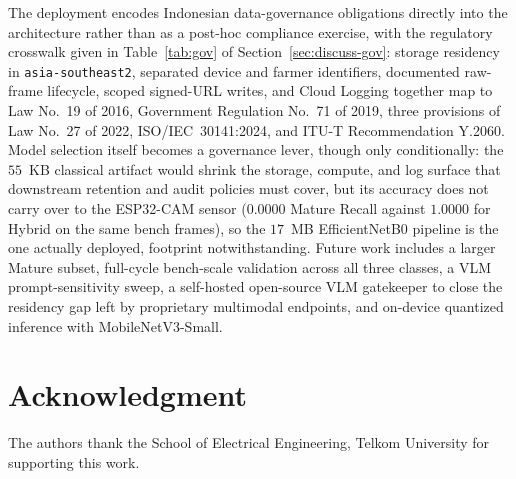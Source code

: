 \documentclass[conference]{IEEEtran}
\begin{document}
The deployment encodes Indonesian data-governance obligations directly into the architecture rather than as a post-hoc compliance exercise, with the regulatory crosswalk given in Table~\ref{tab:gov} of Section~\ref{sec:discuss-gov}: storage residency in \texttt{asia-southeast2}, separated device and farmer identifiers, documented raw-frame lifecycle, scoped signed-URL writes, and Cloud Logging together map to Law No.~19 of 2016, Government Regulation No.~71 of 2019, three provisions of Law No.~27 of 2022, ISO/IEC~30141:2024, and ITU-T Recommendation Y.2060. Model selection itself becomes a governance lever, though only conditionally: the $55$~KB classical artifact would shrink the storage, compute, and log surface that downstream retention and audit policies must cover, but its accuracy does not carry over to the ESP32-CAM sensor ($0.0000$ Mature Recall against $1.0000$ for Hybrid on the same bench frames), so the $17$~MB EfficientNetB0 pipeline is the one actually deployed, footprint notwithstanding. Future work includes a larger Mature subset, full-cycle bench-scale validation across all three classes, a VLM prompt-sensitivity sweep, a self-hosted open-source VLM gatekeeper to close the residency gap left by proprietary multimodal endpoints, and on-device quantized inference with MobileNetV3-Small.

\section*{Acknowledgment}
The authors thank the School of Electrical Engineering, Telkom University for supporting this work.
\end{document}
